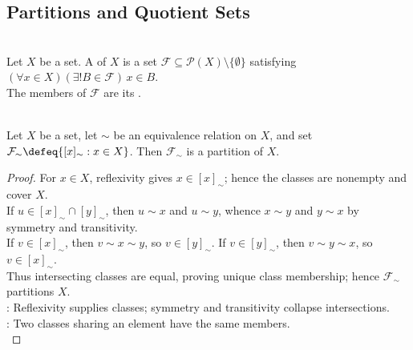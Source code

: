 \subsection{Partitions and Quotient Sets}

\begin{definition} \label{def:partition-of-a-set} \\
Let $X$ be a set. A  of $X$ is a set $\mathcal{F}\subseteq\mathcal{P}(X)\setminus\{\emptyset\}$ satisfying $(\forall x\in X)(\exists! B\in\mathcal{F})\,x\in B$.\\
The members of $\mathcal{F}$ are its .
\end{definition}

\begin{proposition} \label{prop:equivalence-relations-partitions} \\
Let $X$ be a set, let $\sim$ be an equivalence relation on $X$, and set $\mathcal{F}_{\sim}\defeq\{[x]_{\sim}:x\in X\}$. Then $\mathcal{F}_{\sim}$ is a partition of $X$.
\begin{proof}
For $x\in X$, reflexivity gives $x\in[x]_{\sim}$; hence the classes are nonempty and cover $X$.\\
If $u\in[x]_{\sim}\cap[y]_{\sim}$, then $u\sim x$ and $u\sim y$, whence $x\sim y$ and $y\sim x$ by symmetry and transitivity.\\
If $v\in[x]_{\sim}$, then $v\sim x\sim y$, so $v\in[y]_{\sim}$. If $v\in[y]_{\sim}$, then $v\sim y\sim x$, so $v\in[x]_{\sim}$.\\
Thus intersecting classes are equal, proving unique class membership; hence $\mathcal{F}_{\sim}$ partitions $X$.\\
: Reflexivity supplies classes; symmetry and transitivity collapse intersections.\\
: Two classes sharing an element have the same members.\\
\end{proof}
\end{proposition}

\begin{illustrationfigure}[H]
  \centering
  
  \caption{Equivalence classes form disjoint blocks that cover the underlying set.}
  \label{fig:equivalence-classes-partition}
\end{illustrationfigure}

